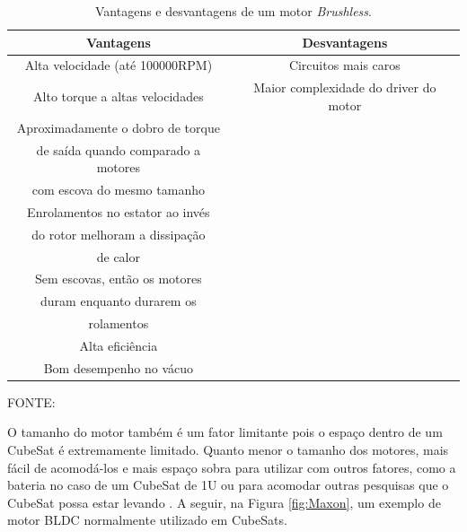 \documentclass[
	12pt,				%
	openany,			%
	twoside,			%
	a4paper,			%
	english,			%
	french,				%
	spanish,			%
	brazil,				%
	oldfontcommands
	]{abntex2}
\begin{document}
\begin{table}[h]
	\caption{Vantagens e desvantagens de um motor \textit{Brushless}.}
		\centering
	\begin{tabular}{|c|c|}
		\hline
		\textbf{Vantagens} & \textbf{Desvantagens} \\ 
		\hline 
		Alta velocidade (até 100000RPM) & Circuitos mais caros \\ 
		\hline 
		Alto torque a altas velocidades & Maior complexidade do driver do motor \\ 
		\hline 
		Aproximadamente o dobro de torque & \\
		 de saída quando comparado a motores & \\
		  com escova do mesmo tamanho &  \\ 
		\hline 
		Enrolamentos no estator ao invés & \\
		 do rotor melhoram a dissipação & \\
		  de calor & \\ 
		\hline 
		Sem escovas, então os motores & \\
		 duram enquanto durarem os & \\
		  rolamentos & \\ 
		\hline 
		Alta eficiência & \\ 
		\hline 
		Bom desempenho no vácuo & \\ 
		\hline
	\end{tabular}
	
	\begin{small}
	\vspace{3pt}	
	FONTE: \cite{Ericksson}
	\end{small}
	\label{tab:VnteDesv}
\end{table}


O tamanho do motor também é um fator limitante pois o espaço dentro de um CubeSat é extremamente limitado. Quanto menor o tamanho dos motores, mais fácil de acomodá-los e mais espaço sobra para utilizar com outros fatores, como a bateria no caso de um CubeSat de 1U ou para acomodar outras pesquisas que o CubeSat possa estar levando \cite{Martins}. A seguir, na Figura \ref{fig:Maxon}, um exemplo de motor BLDC normalmente utilizado em CubeSats.
\end{document}
